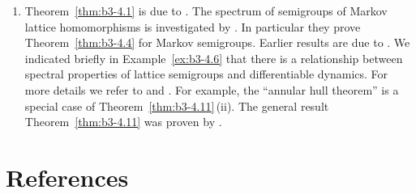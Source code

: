 \begin{enumerate}[label=\emph{Section \arabic*:}, wide]
\item
Theorem~\ref{thm:b3-4.1} is due to \textcite{derndinger:1984}.
The spectrum of semigroups of Markov lattice homomorphisms is investigated by \textcite{derndingernagel:1979}.
In particular they prove Theorem~\ref{thm:b3-4.4} for Markov semigroups.
Earlier results are due to \textcite{scarpellini:1974}.
We indicated briefly in Example~\ref{ex:b3-4.6} that there is a relationship between spectral properties of lattice semigroups and differentiable dynamics.
For more details we refer to \textcite{chiconeswanson:1981} and \textcite{sackersell:1978}.
For example, the \enquote{annular hull theorem} is a special case of Theorem~\ref{thm:b3-4.11}\,(ii).
The general result Theorem~\ref{thm:b3-4.11} was proven by \textcite{arendtgreiner:1984}.

\end{enumerate}
\section*{References}
{\RaggedRight
  \printbibliography[heading=none]
 }
 
 